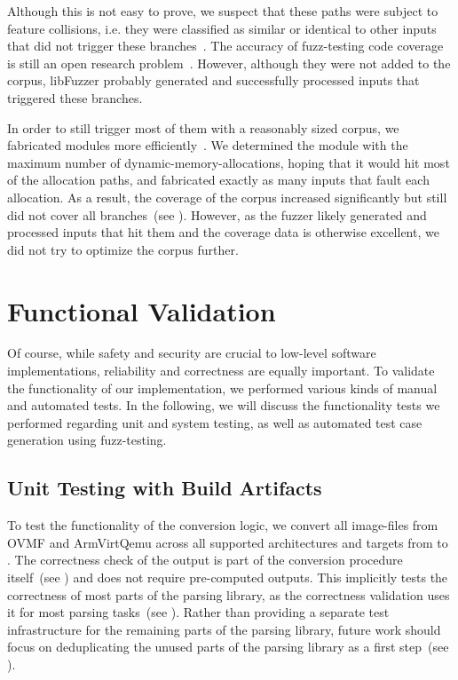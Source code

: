 Although this is not easy to prove, we suspect that these paths were subject to feature collisions, i.e. they were classified as similar or identical to other inputs that did not trigger these branches~\cite{libfuzzer-coll}. The accuracy of \gls{fuzz-testing} code coverage is still an open research problem~\cite{8418631}. However, although they were not added to the corpus, libFuzzer probably generated and successfully processed inputs that triggered these branches.

In order to still trigger most of them with a reasonably sized corpus, we fabricated modules more efficiently~\cite{thesis-git}. We determined the module with the maximum number of \glspl{dynamic-memory-allocation}, hoping that it would hit most of the allocation paths, and fabricated exactly as many inputs that fault each allocation. As a result, the coverage of the corpus increased significantly but still did not cover all branches~(see ). However, as the fuzzer likely generated and processed inputs that hit them and the coverage data is otherwise excellent, we did not try to optimize the corpus further.

\section{Functional Validation}
\label{sec:func_val}

Of course, while safety and security are crucial to low-level software implementations, reliability and correctness are equally important. To validate the functionality of our implementation, we performed various kinds of manual and automated tests. In the following, we will discuss the functionality tests we performed regarding unit and system testing, as well as automated test case generation using \gls{fuzz-testing}.

\subsection{Unit Testing with Build Artifacts}
\label{sec:unit_tests}

To test the functionality of the conversion logic, we convert all \glspl{image-file} from \gls{OVMF} and \gls{ArmVirtQemu} across all supported architectures and targets from  to . The correctness check of the output is part of the conversion procedure itself~(see ) and does not require pre-computed outputs. This implicitly tests the correctness of most parts of the parsing library, as the correctness validation uses it for most parsing tasks~(see ). Rather than providing a separate test infrastructure for the remaining parts of the parsing library, future work should focus on deduplicating the unused parts of the parsing library as a first step~(see ).

